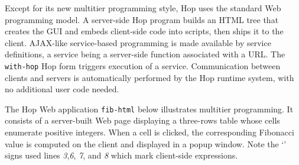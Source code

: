 \documentclass{llncs}
\begin{document}
Except for its new multitier programming style, Hop uses the standard
Web programming model. A server-side Hop program builds an HTML tree
that creates the GUI and embeds client-side code into scripts, then
ships it to the client.  AJAX-like service-based programming is made
available by service definitions, a service being a server-side
function associated with a URL.  The {\texttt{with-hop}} Hop form
triggers execution of a service.  Communication between clients and
servers is automatically performed by the Hop runtime system, with no
additional user code needed.

The Hop Web application \texttt{fib-html} below illustrates multitier
programming. It consists of a server-built Web page displaying a
three-rows table whose cells enumerate positive integers. When a cell
is clicked, the corresponding Fibonacci value is computed on the
client and displayed in a popup window. Note the
`{\texttt{{}}}' signs used lines {\em{3}},{\em{6}}, {\em{7}},
and {\em{8}} which mark client-side expressions.
\end{document}
